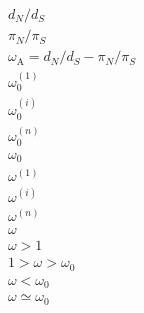 \documentclass{article}
\newcommand{\dn}{d_N}
\newcommand{\ds}{d_S}
\newcommand{\dnds}{\dn / \ds}
\newcommand{\pn}{\pi_N}
\newcommand{\ps}{\pi_S}
\newcommand{\pnps}{\pn / \ps}
\begin{document}
\begin{gather*}
	\dnds \\
	\pnps \\
	\omega_{\mathrm{A}} = \dnds-\pnps \\
	\omega_{0}^{(1)} \\
	\omega_{0}^{(i)} \\
	\omega_{0}^{(n)} \\
	\omega_{0} \\
	\omega^{(1)}  \\
	\omega^{(i)} \\
	\omega^{(n)} \\
	\omega \\
	\omega > 1 \\
	1 > \omega > \omega_0 \\
	\omega < \omega_0 \\
	\omega \simeq \omega_0
\end{gather*}
\end{document}
